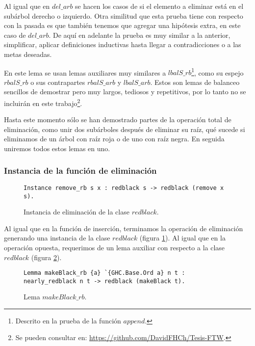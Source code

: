 Al igual que en \hyperref[lema_6]{$del\_arb$} se hacen los casos de si el elemento a eliminar est\'a 
en el subárbol derecho o izquierdo. Otra similitud que esta prueba tiene con respecto con la pasada 
es que también tenemos que agregar una hipótesis extra, en este caso de 
\hyperref[lema_6]{$del\_arb$}. De aquí en adelante la prueba es muy similar a la anterior, 
simplificar, aplicar definiciones inductivas hasta llegar a contradicciones o a las metas deseadas.

En este lema se usan lemas auxiliares muy similares a $lbalS\_rb$\footnote{Descrito en la prueba de
la  funci\'on \hyperref[func_app]{$append$}.}, como su espejo $rbalS\_rb$ o sus contrapartes 
$rbalS\_arb$ y $lbalS\_arb$. Estos son lemas de balanceo sencillos de demostrar pero muy largos, 
tediosos y repetitivos, por lo tanto no se incluirán en este trabajo\footnote{Se pueden consultar 
en: \url{https://github.com/DavidFHCh/Tesis-FTW}.}.

Hasta este momento s\'olo se han demostrado partes de la operación total de 
eliminación, como unir
dos subárboles despu\'es de eliminar su ra\'iz, qu\'e sucede si eliminamos de 
un árbol con raíz roja o
de uno con raíz negra. En seguida uniremos todos estos lemas en uno.

\subsubsection{Instancia de la funci\'on de eliminaci\'on}

\begin{figure}[!ht]
\centering
\captionsetup{justification=centering}
\begin{verbatim}
Instance remove_rb s x : redblack s -> redblack (remove x s).
\end{verbatim}
\caption{Instancia de eliminaci\'on de la clase \hyperref[class_rb]{$redblack$}.}
\label{instance_del}
\end{figure}


Al igual que en la funci\'on de inserción, terminamos la operación de eliminaci\'on generando una
instancia de la clase \hyperref[class_rb]{$redblack$} (figura \ref{instance_del}). Al igual que en la 
operación opuesta, requerimos de un lema auxiliar con respecto a la clase 
\hyperref[class_rb]{$redblack$} (figura \ref{lema_7}).

\begin{figure}[!ht]
\centering
\captionsetup{justification=centering}
\begin{verbatim}
Lemma makeBlack_rb {a} `{GHC.Base.Ord a} n t :
nearly_redblack n t -> redblack (makeBlack t).
\end{verbatim}
\caption{Lema $makeBlack\_rb$.}
\label{lema_7}
\end{figure}


